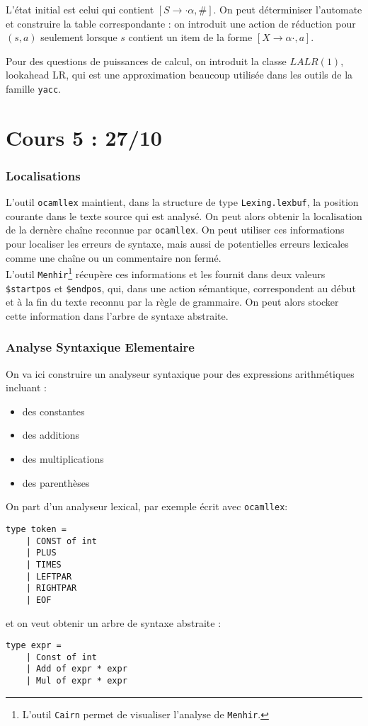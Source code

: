\documentclass{cours}
\begin{document}
L'état initial est celui qui contient $\left[S \rightarrow \cdot \alpha, \#\right]$. On peut déterminiser l'automate et construire la table correspondante : on introduit une action de réduction pour $(s, a)$ seulement lorsque $s$ contient un item de la forme $\left[X \rightarrow \alpha\cdot, a\right]$.

Pour des questions de puissances de calcul, on introduit la classe $LALR(1)$, lookahead LR, qui est une approximation beaucoup utilisée dans les outils de la famille \texttt{yacc}.

\newpage
\part[Analyse Syntaxique 2]{Cours 5 : 27/10}
\localtableofcontents
\section{Localisations}
L'outil \texttt{ocamllex} maintient, dans la structure de type \texttt{Lexing.lexbuf}, la position courante dans le texte source qui est analysé. On peut alors obtenir la localisation de la dernère chaîne reconnue par \texttt{ocamllex}. On peut utiliser ces informations pour localiser les erreurs de syntaxe, mais aussi de potentielles erreurs lexicales comme une chaîne ou un commentaire non fermé.\\
L'outil \texttt{Menhir}\footnote{L'outil \texttt{Cairn} permet de visualiser l'analyse de \texttt{Menhir}.} récupère ces informations et les fournit dans deux valeurs \texttt{\$startpos} et \texttt{\$endpos}, qui, dans une action sémantique, correspondent au début et à la fin du texte reconnu par la règle de grammaire. On peut alors stocker cette information dans l'arbre de syntaxe abstraite. 

\section{Analyse Syntaxique Elementaire}
On va ici construire un analyseur syntaxique pour des expressions arithmétiques incluant :
\begin{itemize}
    \item des constantes
    \item des additions
    \item des multiplications
    \item des parenthèses
\end{itemize}
On part d'un analyseur lexical, par exemple écrit avec \texttt{ocamllex}:
\begin{verbatim}
type token = 
    | CONST of int
    | PLUS
    | TIMES
    | LEFTPAR
    | RIGHTPAR
    | EOF
\end{verbatim}
et on veut obtenir un arbre de syntaxe abstraite : 
\begin{verbatim}
type expr = 
    | Const of int
    | Add of expr * expr
    | Mul of expr * expr
\end{verbatim}
\end{document}
